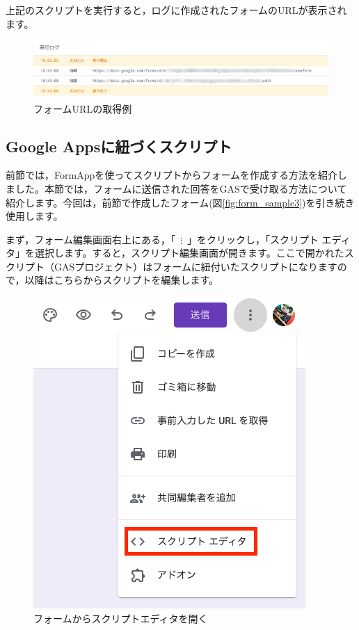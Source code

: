 \documentclass[uplatex,a4j]{jsarticle}
\begin{document}
上記のスクリプトを実行すると，ログに作成されたフォームのURLが表示されます。

\begin{figure}[H]
 \centering
 \includegraphics[keepaspectratio, scale=0.5]{images/form_sample2.png}
 \caption{フォームURLの取得例}
 \label{fig:form_sample2}
\end{figure}

\subsection{Google Appsに紐づくスクリプト}
\label{subsec:event_object}

前節では，FormAppを使ってスクリプトからフォームを作成する方法を紹介しました。本節では，フォームに送信された回答をGASで受け取る方法について紹介します。今回は，前節で作成したフォーム(図\ref{fig:form_sample3})を引き続き使用します。

まず，フォーム編集画面右上にある，「\ $\mathbf{\vdots}$\ 」をクリックし，「スクリプト エディタ」を選択します。すると，スクリプト編集画面が開きます。ここで開かれたスクリプト（GASプロジェクト）はフォームに紐付いたスクリプトになりますので，以降はこちらからスクリプトを編集します。

\begin{figure}[H]
 \centering
 \includegraphics[keepaspectratio, scale=0.5]{images/open_script_editor.png}
 \caption{フォームからスクリプトエディタを開く}
 \label{fig:form_sample4}
\end{figure}
\end{document}
